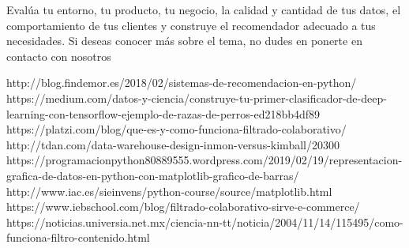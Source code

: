 \documentclass[preprint,12pt]{elsarticle}
\begin{document}
Evalúa tu entorno, tu producto, tu negocio, la calidad y cantidad de tus datos, el comportamiento de tus clientes y construye el recomendador adecuado a tus necesidades. Si deseas conocer más sobre el tema, no dudes en ponerte en contacto con nosotros

	

	
	
	\newpage
	
	   \begin{thebibliography}{0}
               http://blog.findemor.es/2018/02/sistemas-de-recomendacion-en-python/
	     https://medium.com/datos-y-ciencia/construye-tu-primer-clasificador-de-deep-learning-con-tensorflow-ejemplo-de-razas-de-perros-ed218bb4df89	
 	     https://platzi.com/blog/que-es-y-como-funciona-filtrado-colaborativo/
                  http://tdan.com/data-warehouse-design-inmon-versus-kimball/20300
                   https://programacionpython80889555.wordpress.com/2019/02/19/representacion-grafica-de-datos-en-python-con-matplotlib-grafico-de-barras/
                   http://www.iac.es/sieinvens/python-course/source/matplotlib.html
                     https://www.iebschool.com/blog/filtrado-colaborativo-sirve-e-commerce/
                    https://noticias.universia.net.mx/ciencia-nn-tt/noticia/2004/11/14/115495/como-funciona-filtro-contenido.html

         \end{thebibliography}
	
\end{document}
